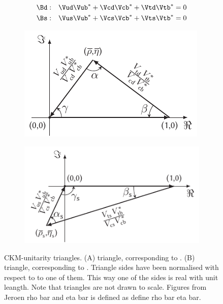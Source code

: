 \begin{subequations}
  \label{unitConstraints}
  \begin{align}
    \Bd : & \quad \Vud\Vub^* + \Vcd\Vcb^* + \Vtd\Vtb^* = 0
    \label{unitConstraints_Bd} \\
    \Bs : & \quad \Vus\Vub^* + \Vcs\Vcb^* + \Vts\Vtb^* = 0
    \label{unitConstraints_Bs}
  \end{align}
\end{subequations}

\begin{figure}[h]
  \centering
  \begin{subfigure}{0.475\textwidth}
    \raggedright
    \includegraphics[width=\textwidth]{Figures/Chapter1/b-d-triangle}
    \caption{}
    \label{unitTriangles_bd}
  \end{subfigure}%
  \begin{subfigure}{0.525\textwidth}
    \raggedleft
    \includegraphics[width=\textwidth]{Figures/Chapter1/b-s-triangle}
    \caption{}
    \label{unitTriangles_bs}
  \end{subfigure}
  \caption{CKM-unitarity triangles. (A) \Bd triangle, corresponding to . (B) \Bs triangle,
           corresponding to . Triangle sides have been normalised with respect to to one of them.
           This way one of the sides is real with unit leangth. Note that triangles are not drawn to scale. Figures from {\color{red} Jeroen}
           rho bar and eta bar is defined as {\color{red} define rho bar eta bar}.  }
  \label{unitTriangles}
\end{figure}

